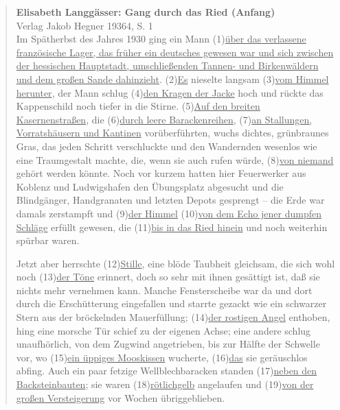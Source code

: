 \documentclass[12pt,a4paper,twoside]{article}
\newenvironment{nohyphens}{%
  \par
  \hyphenpenalty=10000
  \exhyphenpenalty=10000
  \sloppy
}{\par}
\begin{document}
\begin{nohyphens}
  \begin{quote}
    \textbf{Elisabeth Langgässer: Gang durch das Ried (Anfang)}\\
    Verlag Jakob Hegner 19364, S. 1\\[0.5\baselineskip]

    Im Spätherbst des Jahres 1930 ging ein Mann (1)\ul{über das verlassene französische Lager, das früher ein deutsches gewesen war und sich zwischen der hessischen Hauptstadt, umschließenden Tannen- und Birkenwäldern und dem großen Sande dahinzieht}.
    (2)\ul{Es} nieselte langsam (3)\ul{vom Himmel herunter}, der Mann schlug (4)\ul{den Kragen der Jacke} hoch und rückte das Kappenschild noch tiefer in die Stirne.
    (5)\ul{Auf den breiten Kasernenstraßen}, die (6)\ul{durch leere Barackenreihen}, (7)\ul{an Stallungen, Vorratshäusern und Kantinen} vorüberführten, wuchs dichtes, grünbraunes Gras, das jeden Schritt verschluckte und den Wandernden wesenlos wie eine Traumgestalt machte, die, wenn sie auch rufen würde, (8)\ul{von niemand} gehört werden könnte.
    Noch vor kurzem hatten hier Feuerwerker aus Koblenz und Ludwigshafen den Übungsplatz abgesucht und die Blindgänger, Handgranaten und letzten Depots gesprengt – die Erde war damals zerstampft und (9)\ul{der Himmel} (10)\ul{von dem Echo jener dumpfen Schläge} erfüllt gewesen, die (11)\ul{bis in das Ried hinein} und noch weiterhin spürbar waren.

      Jetzt aber herrschte (12)\ul{Stille}, eine blöde Taubheit gleichsam, die sich wohl noch (13)\ul{der Töne} erinnert, doch so sehr mit ihnen gesättigt ist, daß sie nichts mehr vernehmen kann.
      Manche Fensterscheibe war da und dort durch die Erschütterung eingefallen und starrte gezackt wie ein schwarzer Stern aus der bröckelnden Mauerfüllung; (14)\ul{der rostigen Angel} enthoben, hing eine morsche Tür schief zu der eigenen Achse; eine andere schlug unaufhörlich, von dem Zugwind angetrieben, bis zur Hälfte der Schwelle vor, wo (15)\ul{ein üppiges Mooskissen} wucherte, (16)\ul{das} sie geräuschlos abfing.
      Auch ein paar fetzige Wellblechbaracken standen (17)\ul{neben den Backsteinbauten}; sie waren (18)\ul{rötlichgelb} angelaufen und (19)\ul{von der großen Versteigerung} vor Wochen übriggeblieben.


\end{quote}
\end{nohyphens}
\end{document}

